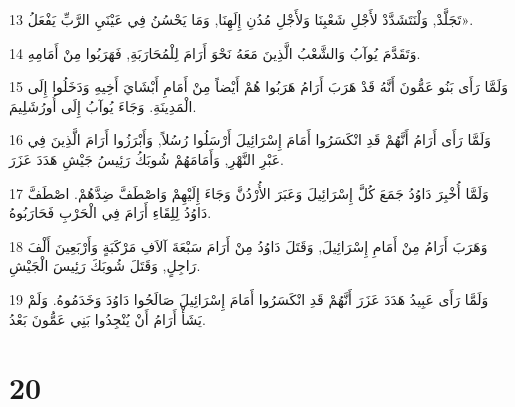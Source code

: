 \par 13 تَجَلَّدْ, وَلْنَتَشَدَّدْ لأَجْلِ شَعْبِنَا وَلأَجْلِ مُدُنِ إِلَهِنَا, وَمَا يَحْسُنُ فِي عَيْنَيِ الرَّبِّ يَفْعَلُ».
\par 14 وَتَقَدَّمَ يُوآبُ وَالشَّعْبُ الَّذِينَ مَعَهُ نَحْوَ أَرَامَ لِلْمُحَارَبَةِ, فَهَرَبُوا مِنْ أَمَامِهِ.
\par 15 وَلَمَّا رَأَى بَنُو عَمُّونَ أَنَّهُ قَدْ هَرَبَ أَرَامُ هَرَبُوا هُمْ أَيْضاً مِنْ أَمَامِ أَبْشَايَ أَخِيهِ وَدَخَلُوا إِلَى الْمَدِينَةِ. وَجَاءَ يُوآبُ إِلَى أُورُشَلِيمَ.
\par 16 وَلَمَّا رَأَى أَرَامُ أَنَّهُمْ قَدِ انْكَسَرُوا أَمَامَ إِسْرَائِيلَ أَرْسَلُوا رُسُلاً, وَأَبْرَزُوا أَرَامَ الَّذِينَ فِي عَبْرِ النَّهْرِ, وَأَمَامَهُمْ شُوبَكُ رَئِيسُ جَيْشِ هَدَدَ عَزَرَ.
\par 17 وَلَمَّا أُخْبِرَ دَاوُدُ جَمَعَ كُلَّ إِسْرَائِيلَ وَعَبَرَ الأُرْدُنَّ وَجَاءَ إِلَيْهِمْ وَاصْطَفَّ ضِدَّهُمْ. اصْطَفَّ دَاوُدُ لِلِقَاءِ أَرَامَ فِي الْحَرْبِ فَحَارَبُوهُ.
\par 18 وَهَرَبَ أَرَامُ مِنْ أَمَامِ إِسْرَائِيلَ, وَقَتَلَ دَاوُدُ مِنْ أَرَامَ سَبْعَةَ آلاَفِ مَرْكَبَةٍ وَأَرْبَعِينَ أَلْفَ رَاجِلٍ, وَقَتَلَ شُوبَكَ رَئِيسَ الْجَيْشِ.
\par 19 وَلَمَّا رَأَى عَبِيدُ هَدَدَ عَزَرَ أَنَّهُمْ قَدِ انْكَسَرُوا أَمَامَ إِسْرَائِيلَ صَالَحُوا دَاوُدَ وَخَدَمُوهُ. وَلَمْ يَشَأْ أَرَامُ أَنْ يُنْجِدُوا بَنِي عَمُّونَ بَعْدُ.

\chapter{20}


